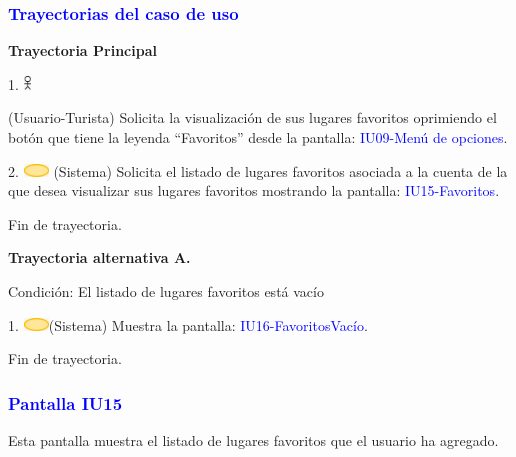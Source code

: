 \pagebreak
\subsubsection{\textcolor{blue}{Trayectorias del caso de uso}}
\textbf{Trayectoria Principal}{

     1. \includegraphics[width=0.0150\textwidth]{Figuras/persona.png}{
        (Usuario-Turista)
        Solicita la visualización de sus lugares favoritos oprimiendo el botón que tiene la leyenda “Favoritos” desde la pantalla: \textcolor{blue}{IU09-Menú de opciones}.
     
     }
    
      2. \includegraphics[width=0.0500\textwidth]{Figuras/sistema.png} {
        (Sistema) Solicita el listado de lugares favoritos asociada a la cuenta de la que desea visualizar sus lugares favoritos mostrando la pantalla: \textcolor{blue}{IU15-Favoritos}.
      }

      Fin de trayectoria.
}


\par
\vspace{1cm}
\textbf{Trayectoria alternativa A.}{
    {\scriptsize Condición: El listado de lugares favoritos está vacío}
    \par
    1. \includegraphics[width=0.05\textwidth]{Figuras/sistema.png}{(Sistema) Muestra la pantalla: \textcolor{blue}{IU16-FavoritosVacío}.
    }
    \par
    Fin de trayectoria.
}




\subsubsection{\textcolor{blue}{Pantalla IU15}}
Esta pantalla muestra el listado de lugares favoritos que el usuario ha agregado.

